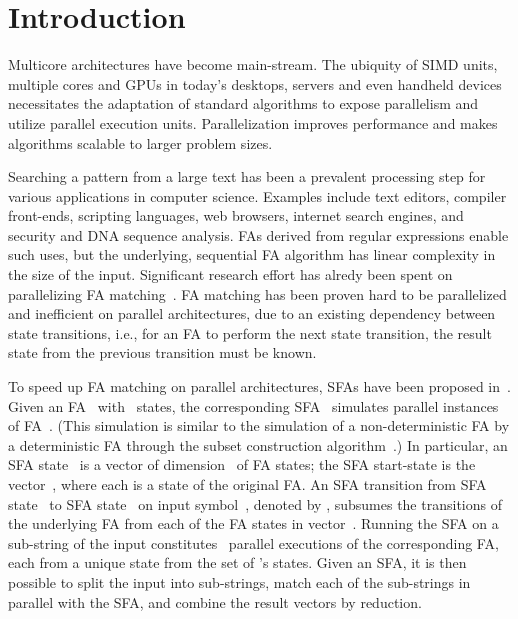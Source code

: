 \documentclass[10pt, conference, compsocconf]{IEEEtran}
\begin{document}
\IEEEpeerreviewmaketitle

\section{Introduction}
\label{sec:introduction}

Multicore architectures have 
become main-stream. The
ubiquity of SIMD units, multiple cores and GPUs in today's desktops,
servers and even handheld devices necessitates the adaptation of
standard algorithms to expose parallelism and utilize
parallel execution units. Parallelization improves performance 
and makes algorithms scalable to larger problem sizes.

Searching a pattern from a large text has been a prevalent processing
step for various applications in computer science. Examples include
text editors, compiler front-ends, scripting languages, web
browsers, internet search engines, and security and DNA sequence
analysis. FAs derived from regular expressions  enable
such
uses, but the underlying, sequential FA algorithm
has linear complexity in the size of the input.
Significant research effort has alredy been
spent on parallelizing FA matching~\cite{Ladner:1980,Hillis:1986,Misra:2003,ScarpazzaVP07,Holub:2009,Jones2009,Luchaup2009,WangHL10,Luchaup2011,Ko2014,Mytkowicz2014}.
FA matching has been proven hard to be parallelized and inefficient
on parallel architectures, due to an existing dependency between state
transitions, i.e., for an FA to perform the next state transition, the
result state from the previous transition must be known.

To speed up FA matching on parallel architectures, SFAs have been proposed
in~\cite{Sinya2013}.  Given an FA~ with ~states, the corresponding
SFA~ simulates  parallel instances of FA~. (This simulation is
similar to the simulation of a non-deterministic FA by a deterministic FA
through the subset construction algorithm~\cite{HopcroftU79}.) In particular,
an SFA state~ is a vector of dimension~ of FA states; the SFA start-state
is the vector~, where each  is a state
of the original FA. An SFA transition from SFA state~ to SFA state~
on input symbol~, denoted by ,
subsumes the transitions of the underlying FA from each of the FA states in
vector~. Running the SFA on a sub-string of the input constitutes
~parallel executions of the corresponding FA, each from a unique state
from the set of 's states.  Given an SFA, it is then possible to split the
input into sub-strings, match each of the sub-strings in parallel with the SFA,
and combine the result vectors by reduction.
\end{document}
